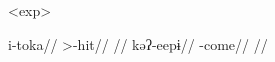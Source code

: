 \pex<exp>\akuriyo
\begin{multicols}{2}
\begingl
\gla i-toka//
\glb {}>-hit//
\glft {} \parencite[][86]{gildea1994akuriyo}//
\endgl
{}
\begingl
\gla kəʔ-eepɨ//
\glb {}-come//
\glft {} \parencite[][114]{meira1998proto}//
\endgl
\end{multicols}
\xe
%
%
%
%


%

